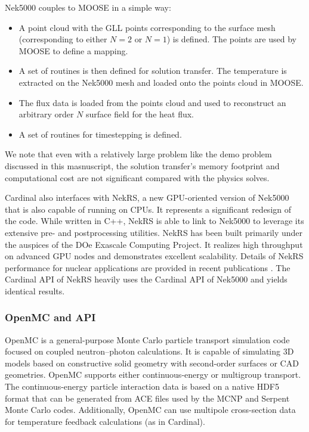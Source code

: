 Nek5000 couples to MOOSE in a simple way:
\begin{itemize}
\item A point cloud with the GLL points corresponding to the surface mesh (corresponding to either $N = 2$ or $N = 1$) is defined. The points are used by MOOSE to define a mapping.
\item A set of routines is then defined for solution transfer. The temperature is extracted on the Nek5000 mesh and loaded onto the points cloud in MOOSE.
\item The flux data is loaded from the points cloud and used to reconstruct an arbitrary order $N$ surface field for the heat
flux.
\item A set of routines for timestepping is defined.
\end{itemize}
We note that even with a relatively large problem like the demo problem
discussed in this masnuscript, the solution transfer's memory footprint and
computational cost are not significant compared with the physics solves.


Cardinal also interfaces with NekRS, a new GPU-oriented version of Nek5000
that is also capable of running on CPUs. It represents a significant redesign
of the code.  While written in C++, NekRS is able to link to Nek5000 to
leverage its extensive pre- and postprocessing utilities.  NekRS has been
built primarily under the auspices of the DOe Exascale Computing Project. It
realizes high throughput on advanced GPU nodes and demonstrates excellent
scalability.  Details of NekRS performance for nuclear applications are
provided in recent publications \cite{merzari2020toward}. The Cardinal API of
NekRS heavily uses the Cardinal API of Nek5000 and yields identical results.

\subsubsection{OpenMC and API}

OpenMC \cite{romano2015openmc} is a general-purpose Monte Carlo particle transport simulation code focused on coupled neutron--photon calculations. It is
capable of simulating 3D models based on constructive solid geometry with second-order surfaces or CAD geometries. OpenMC
supports either continuous-energy or multigroup transport. The continuous-energy particle interaction data
is based on a native HDF5 format that can be generated from ACE files used by the MCNP and Serpent
Monte Carlo codes. Additionally, OpenMC can use multipole cross-section data for temperature feedback
calculations (as in Cardinal).

